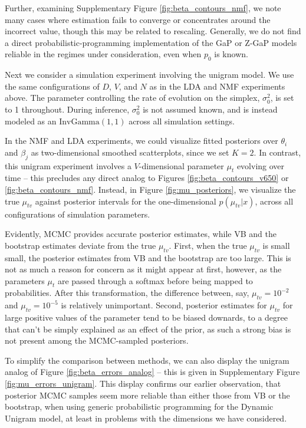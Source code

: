 \documentclass[oupdraft]{bio}
\begin{document}
Further, examining Supplementary Figure \ref{fig:beta_contours_nmf}, we note
many cases where estimation fails to converge or concentrates around the
incorrect value, though this may be related to rescaling. Generally, we do not
find a direct probabilistic-programming implementation of the GaP or Z-GaP
models reliable in the regimes under consideration, even when $p_{0}$ is known.

Next we consider a simulation experiment involving the unigram model. We use the
same configurations of $D$, $V$, and $N$ as in the LDA and NMF experiments
above. The parameter controlling the rate of evolution on the simplex,
$\sigma_{0}^2$, is set to 1 throughout. During inference, $\sigma_0^2$ is not
assumed known, and is instead modeled as an $\text{InvGamma}\left(1, 1\right)$
across all simulation settings.

In the NMF and LDA experiments, we could visualize fitted posteriors over
$\theta_i$ and $\beta_j$ as two-dimensional smoothed scatterplots, since we set
$K = 2$. In contrast, this unigram experiment involves a $V$-dimensional
parameter $\mu_t$ evolving over time -- this precludes any direct analog to
Figures \ref{fig:beta_contours_v650} or \ref{fig:beta_contours_nmf}. Instead, in
Figure \ref{fig:mu_posteriors}, we visualize the true $\mu_{tv}$ against
posterior intervals for the one-dimensional $p\left(\mu_{tv} \vert x\right)$,
across all configurations of simulation parameters.

Evidently, MCMC provides accurate posterior estimates, while VB and the
bootstrap estimates deviate from the true $\mu_{tv}$. First, when the true
$\mu_{tv}$ is small small, the posterior estimates from VB and the bootstrap are
too large. This is not as much a reason for concern as it might appear at first,
however, as the parameters $\mu_t$ are passed through a softmax before being
mapped to probabilities. After this transformation, the difference between, say,
$\mu_{tv} = 10^{-2}$ and $\mu_{tv} = 10^{-5}$ is relatively unimportant. Second,
posterior estimates for $\mu_{tv}$ for large positive values of the parameter
tend to be biased downards, to a degree that can't be simply explained as an
effect of the prior, as such a strong bias is not present among the MCMC-sampled
posteriors.

To simplify the comparison between methods, we can also display the unigram
analog of Figure \ref{fig:beta_errors_analog} -- this is given in Supplementary
Figure \ref{fig:mu_errors_unigram}. This display confirms our earlier
observation, that posterior MCMC samples seem more reliable than either those
from VB or the bootstrap, when using generic probabilistic programming for the
Dynamic Unigram model, at least in problems with the dimensions we have
considered.
\end{document}
